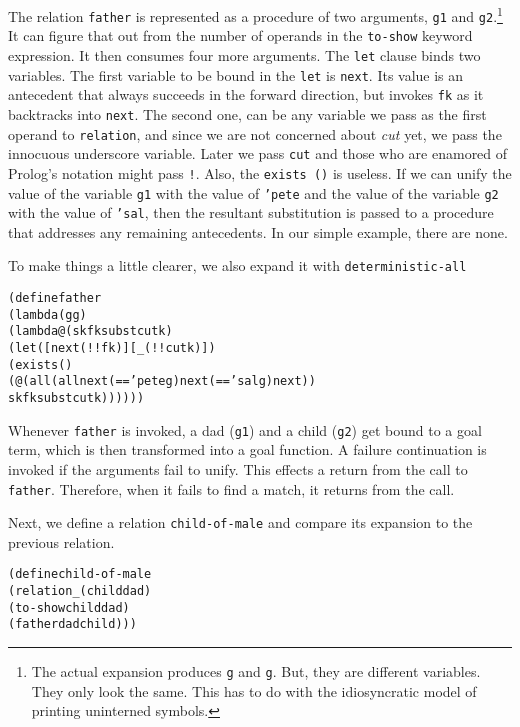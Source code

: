 The relation \texttt{father} is represented as a procedure of two
arguments, \texttt{g1} and \texttt{g2}.\footnote{The actual expansion
produces \texttt{g} and \texttt{g}.  But, they are different
variables.  They only look the same.  This has to do with the
idiosyncratic model of printing uninterned symbols.} It can figure
that out from the number of operands in the \texttt{to-show} keyword
expression.  It then consumes four more arguments.  The \texttt{let}
clause binds two variables.  The first variable to be bound in the
\texttt{let} is \texttt{next}.  Its value is an antecedent that always
succeeds in the forward direction, but invokes \texttt{fk} as it
backtracks into \texttt{next}.  The second one, can be any variable we
pass as the first operand to \texttt{relation}, and since we are not
concerned about \emph{cut} yet, we pass the innocuous underscore
variable.  Later we pass \texttt{cut} and those who are enamored of
Prolog's notation might pass \texttt{!}.  Also, the \texttt{exists ()}
is useless.  If we can unify the value of the variable \texttt{g1}
with the value of \texttt{'pete} and the value of the variable
\texttt{g2} with the value of \texttt{'sal}, then the resultant
substitution is passed to a procedure that addresses any remaining
antecedents.  In our simple example, there are none.
\newpage

To make things a little clearer, we also expand it with 
\texttt{deterministic-all}

\begin{alltt}
(define father
  (lambda (g g)
    (lambda@ (sk fk subst cutk)
      (let ([next (!! fk)] [_ (!! cutk)])
        (exists ()
          (@ (all (all next (== 'pete g) next (== 'sal g) next))
             sk fk subst cutk))))))
\end{alltt}

Whenever \texttt{father} is invoked, a dad (\texttt{g1}) and a child
(\texttt{g2}) get bound to a goal term, which is then transformed into
a goal function.  A failure continuation is invoked if the arguments
fail to unify.  This effects a return from the call to
\texttt{father}.  Therefore, when it fails to find a match, it returns
from the call.

Next, we define a relation \texttt{child-of-male} and compare its expansion
to the previous relation.

\begin{alltt}
(define child-of-male
  (relation _ (child dad)
    (to-show child dad)
    (father dad child)))
\end{alltt}

